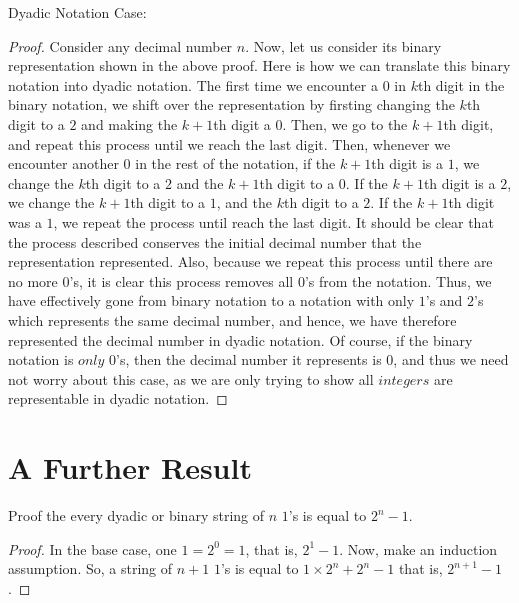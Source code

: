 \documentclass{article}
\theoremstyle{definition}
\begin{document}
Dyadic Notation Case:\newline
\begin{proof}
Consider any decimal number $n$. Now, let us consider its binary representation shown in the above proof. Here is how we can translate this binary 
notation into dyadic notation. The first time we encounter a $0$ in $k$th digit in the binary notation, we shift over the representation by firsting changing
the $k$th digit to a $2$ and making the $k+1$th digit a $0$. Then, we go to the $k+1$th digit, and repeat this process until we reach the last digit. Then,
 whenever we encounter another $0$ in the rest of the notation, if the $k+1$th digit is a $1$, we change the $k$th digit to a $2$ and the $k+1$th digit to a 
$0$. If the $k+1$th digit is a $2$, we change the $k+1$th digit to a $1$, and the $k$th digit to a $2$. If the $k+1$th digit was a $1$, we repeat the process
 until reach the last digit. It should be clear that the process described conserves the initial decimal number that the representation represented. Also, 
because we repeat this process until there are no more $0$'s, it is clear this process removes all $0$'s from the notation. Thus, we have effectively gone 
from binary notation to a notation with only $1$'s and $2$'s which represents the same decimal number, and hence, we have therefore represented the decimal
 number in dyadic notation. Of course, if the binary notation is $only$ $0$'s, then the decimal number it represents is $0$, and thus we need not worry about
 this case, as we are only trying to show all $integers$ are representable in dyadic notation.
\end{proof}
\section*{A Further Result}
Proof the every dyadic or binary string of $n$ $1$'s is equal to $2^n-1$.
\begin{proof}
In the base case, one $1=2^0=1$, that is, $2^1-1$. Now, make an induction assumption. So, a string of $n+1$ $1$'s is equal to $1\times 2^n + 2^n-1$ that is,
 $2^{n+1}-1$.
\end{proof} 
\end{document}
